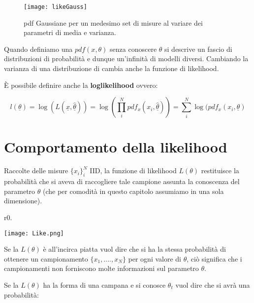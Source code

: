 \documentclass[11pt,a4paper]{book}
\begin{document}
 
\begin{figure}[ht]
\vspace{0.2in}
\texttt{[image: likeGauss]}	
\centering
\vspace{0.2in}
\caption{pdf Gaussiane per un medesimo set di misure al variare dei parametri di media e varianza.}
\end{figure}
\noindent Quando definiamo una $pdf(x,\theta)$ senza conoscere $\theta$ si descrive un fascio di distribuzioni di probabilit\`{a} e dunque un'infinit\`{a} di modelli diversi. Cambiando la varianza di una distribuzione di cambia anche la funzione di likelihood.\newline

\noindent \`{E} possibile definire anche la \textbf{loglikelihood} ovvero:

\begin{equation*}
	 l(\underline{\theta})= \log(L(\underline{x},\underline{\hat{\theta}})) = \log(\prod_{i}^N pdf_{x}(x_i,\underline{\hat{\theta}})) = \sum_{i}^N \log(pdf_{x}(x_{i},\underline{\theta})
\end{equation*}

\section{Comportamento della likelihood}

\noindent Raccolte delle misure $\{x_{i}\}_i^N$ IID, la funzione di likelihood $L(\theta)$ restituisce la probabilit\`{a} che si aveva di raccogliere tale campione assunta la conoscenza del parametro $\theta$  (che per comodit\`{a} in questo capitolo assumiamo in una sola dimensione). 
\hspace{0.5in}

\begin{wrapfigure}{r}{0.\textwidth}
\centering

\texttt{[image: Like.png]}	

\end{wrapfigure}

\noindent Se la $L(\theta)$ \`{e} all'incirca piatta vuol dire che  si ha la stessa probabilit\`{a} di ottenere un campionamento $\{x_1,....,x_N\}$ per ogni valore di $\theta$, ci\`{o} significa che i campionamenti non forniscono molte informazioni sul parametro $\theta$.  

\hspace{0.5in}


Se la $L(\theta)$ ha la forma di una campana e si conosce $\theta_t$ vuol dire che si avr\`{a} una probabilit\`{a}:
\end{document}
